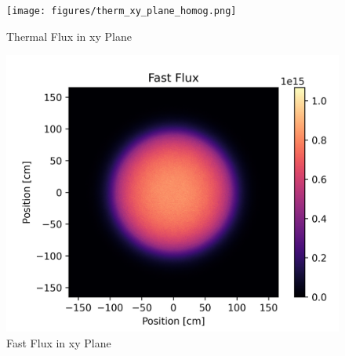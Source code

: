 \begin{figure}[H]
\centering

  \texttt{[image: figures/therm\_xy\_plane\_homog.png]}
  \caption{Thermal Flux in xy Plane}
  \label{fig:hom-plane-therm}

\end{figure}


\begin{figure}[H]
\centering

 \includegraphics[width=1.0\linewidth]{figures/fast_xy_plane_homog.png}
 \caption{Fast Flux in xy Plane}
 \label{fig:hom-plane-fast}

\end{figure}